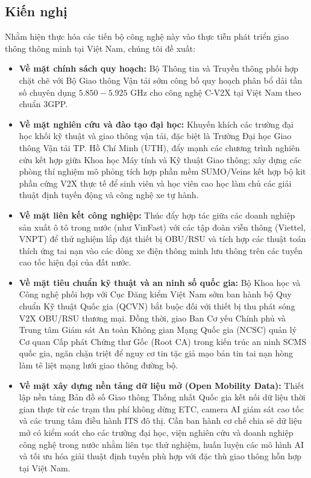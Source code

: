 \documentclass[a4paper]{article}
\begin{document}
\subsection{Kiến nghị}
Nhằm hiện thực hóa các tiến bộ công nghệ này vào thực tiễn phát triển giao thông thông minh tại Việt Nam, chúng tôi đề xuất:
\begin{itemize}
    \item \textbf{Về mặt chính sách quy hoạch:} Bộ Thông tin và Truyền thông phối hợp chặt chẽ với Bộ Giao thông Vận tải sớm công bố quy hoạch phân bổ dải tần số chuyên dụng $5.850 - 5.925$ GHz cho công nghệ C-V2X tại Việt Nam theo chuẩn 3GPP.
    \item \textbf{Về mặt nghiên cứu và đào tạo đại học:} Khuyến khích các trường đại học khối kỹ thuật và giao thông vận tải, đặc biệt là Trường Đại học Giao thông Vận tải TP. Hồ Chí Minh (UTH), đẩy mạnh các chương trình nghiên cứu kết hợp giữa Khoa học Máy tính và Kỹ thuật Giao thông; xây dựng các phòng thí nghiệm mô phỏng tích hợp phần mềm SUMO/Veins kết hợp bộ kit phần cứng V2X thực tế để sinh viên và học viên cao học làm chủ các giải thuật định tuyến động và công nghệ xe tự hành.
    \item \textbf{Về mặt liên kết công nghiệp:} Thúc đẩy hợp tác giữa các doanh nghiệp sản xuất ô tô trong nước (như VinFast) với các tập đoàn viễn thông (Viettel, VNPT) để thử nghiệm lắp đặt thiết bị OBU/RSU và tích hợp các thuật toán thích ứng tai nạn vào các dòng xe điện thông minh lưu thông trên các tuyến cao tốc hiện đại của đất nước.
    \item \textbf{Về mặt tiêu chuẩn kỹ thuật và an ninh số quốc gia:} Bộ Khoa học và Công nghệ phối hợp với Cục Đăng kiểm Việt Nam sớm ban hành bộ Quy chuẩn Kỹ thuật Quốc gia (QCVN) bắt buộc đối với thiết bị thu phát sóng V2X OBU/RSU thương mại. Đồng thời, giao Ban Cơ yếu Chính phủ và Trung tâm Giám sát An toàn Không gian Mạng Quốc gia (NCSC) quản lý Cơ quan Cấp phát Chứng thư Gốc (Root CA) trong kiến trúc an ninh SCMS quốc gia, ngăn chặn triệt để nguy cơ tin tặc giả mạo bản tin tai nạn hòng làm tê liệt mạng lưới giao thông đường bộ.
    \item \textbf{Về mặt xây dựng nền tảng dữ liệu mở (Open Mobility Data):} Thiết lập nền tảng Bản đồ số Giao thông Thống nhất Quốc gia kết nối dữ liệu thời gian thực từ các trạm thu phí không dừng ETC, camera AI giám sát cao tốc và các trung tâm điều hành ITS đô thị. Cần ban hành cơ chế chia sẻ dữ liệu mở có kiểm soát cho các trường đại học, viện nghiên cứu và doanh nghiệp công nghệ trong nước nhằm liên tục thử nghiệm, huấn luyện các mô hình AI và tối ưu hóa giải thuật định tuyến phù hợp với đặc thù giao thông hỗn hợp tại Việt Nam.
\end{itemize}
\end{document}
